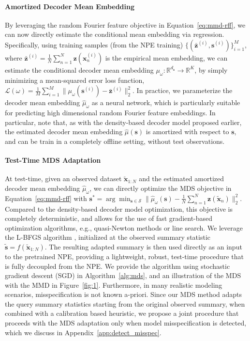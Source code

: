 \documentclass{article}
\theoremstyle{plain}
\theoremstyle{definition}
\theoremstyle{remark}
\begin{document}
\paragraph{Amortized Decoder Mean Embedding} By leveraging the random Fourier feature objective in Equation~\eqref{eq:mmd-rff}, we can now directly estimate the conditional mean embedding via regression. Specifically, using training samples (from the NPE training) \( \{(\bar{\mathbf{z}}^{(i)}, \mathbf{s}^{(i)}) \}_{i=1}^M \), where \( \bar{\mathbf{z}}^{(i)} = \frac{1}{N} \sum_{n=1}^N \mathbf{z}(\mathbf{x}_n^{(i)}) \) is the empirical mean embedding, we can estimate the conditional decoder mean embedding \( \mu_\omega : \mathbb{R}^{d_\mathbf{s}} \to \mathbb{R}^K \), by simply minimizing a mean-squared error loss function, \( \mathcal{L}(\omega) = \frac{1}{M} \sum_{i=1}^M \| \mu_{\omega}(\mathbf{s}^{(i)}) - \bar{\mathbf{z}}^{(i)} \|^2_2 \). In practice, we parameterize the decoder mean embedding \( \hat{\mu}_\omega \) as a neural network, which is particularly suitable for predicting high dimensional random Fourier feature embeddings. In particular, note that, as with the density-based decoder model proposed earlier, the estimated decoder mean embedding \( \hat{\mu}(\mathbf{s}) \) is amortized with respect to \( \mathbf{s} \), and can be train in a completely offline setting, without test observations.

\paragraph{Test-Time MDS Adaptation} At test-time, given an observed dataset \( \tilde{\mathbf{x}}_{1:N} \) and the estimated amortized decoder mean embedding \( \hat{\mu}_\omega \), we can directly optimize the MDS objective in Equation~\eqref{eq:mmd-rff} with \( \mathbf{s}^* = \arg\min_{\mathbf{s} \in \mathcal{S}} \| \hat{\mu}_\omega(\mathbf{s}) - \frac{1}{N}\sum_{n=1}^N \mathbf{z}(\tilde{\mathbf{x}}_n) \|_2^2 \). Compared to the density-based decoder model optimization, this objective is completely deterministic, and allows for the use of fast gradient-based optimization algorithms, e.g., quasi-Newton methods or line search. We leverage the L-BFGS algorithm \citep{liuLimitedMemoryBFGS1989}, initialized at the observed summary statistic \( \tilde{\mathbf{s}} = f(\tilde{\mathbf{x}}_{1:N}) \). The resulting adapted summary is then used directly as an input to the pretrained NPE, providing a lightweight, robust, test-time procedure that is fully decoupled from the NPE. We provide the algorithm using stochastic gradient descent (SGD) in Algorithm~\ref{alg:mds}, and an illustration of the MDS with the MMD in Figure~\ref{fig:1}. Furthermore, in many realistic modeling scenarios, misspecification is not known a-priori. Since our MDS method adapts the query summary statistics starting from the original observed summary, when combined with a calibration based heuristic, we propose a joint procedure that proceeds with the MDS adaptation only when model misspecification is detected, which we discuss in Appendix~\ref{app:detect_misspec}.
\end{document}
